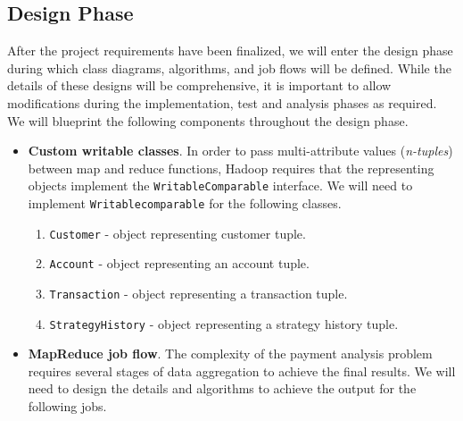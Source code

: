 \documentclass[letterpaper,12pt,titlepage]{article}
\begin{document}
\subsection{Design Phase}
After the project requirements have been finalized, we will enter the
design phase during which class diagrams, algorithms, and job flows will be
defined. While the details of these designs will be comprehensive, it is
important to allow modifications during the implementation, test and analysis
phases as required. We will blueprint the following components throughout the
design phase. 
\begin{itemize}
 \item \textbf{Custom writable classes}. In order to pass multi-attribute values
      (\textit{n-tuples}) between map and reduce functions, Hadoop requires that
      the representing objects implement the \texttt{WritableComparable}
      interface. We will need to implement \texttt{Writablecomparable}     
      for the following classes.
      \begin{enumerate}
       \item \texttt{Customer} - object representing customer tuple.
       \item \texttt{Account} - object representing an account tuple.
       \item \texttt{Transaction} - object representing a transaction tuple.
       \item \texttt{StrategyHistory} - object representing a strategy history
	      tuple.
      \end{enumerate}
 \item \textbf{MapReduce job flow}. The complexity of the payment analysis
      problem requires several stages of data aggregation to achieve the final
      results. We will need to design the details and algorithms to achieve
      the output for the following jobs.


\end{itemize}
\end{document}
